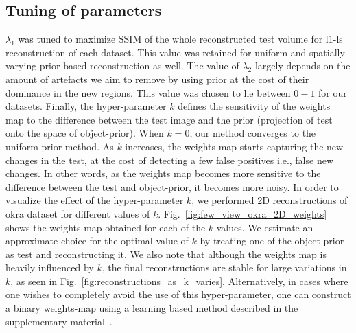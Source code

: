 \documentclass[journal]{IEEEtran}
\begin{document}

\subsection{Tuning of parameters}
\label{subsec:k}
 $\lambda_1$ was tuned to maximize
SSIM of the whole reconstructed test volume for l1-ls reconstruction
of each dataset. This value was retained for uniform and
spatially-varying prior-based reconstruction as well. The value of
$\lambda_2$ largely depends on the amount of artefacts we aim to
remove by using prior at the cost of their dominance in the new
regions. This value was chosen to lie between $0-1$ for our
datasets. Finally, the hyper-parameter $k$ defines the sensitivity of
the weights map to the difference between the test image and the prior
(projection of test onto the space of object-prior). When $k=0$, our
method converges to the uniform prior method. As $k$ increases, the
weights map starts capturing the new changes in the test, at the cost
of detecting a few false positives i.e., false new changes. In other
words, as the weights map becomes more sensitive to the difference
between the test and object-prior, it becomes more noisy. In order to
visualize the effect of the hyper-parameter $k$, we performed 2D
reconstructions of okra dataset for different values of
$k$. Fig.~\ref{fig:few_view_okra_2D_weights} shows the weights map
obtained for each of the $k$ values. We estimate an approximate choice
for the optimal value of $k$ by treating one of the object-prior as
test and reconstructing it. We also note that although the weights map
is heavily influenced by $k$, the final reconstructions are stable for
large variations in $k$, as seen in
Fig.~\ref{fig:reconstructions_as_k_varies}. Alternatively, in cases
where one wishes to completely avoid the use of this hyper-parameter,
one can construct a binary weights-map using a learning based method
described in the supplementary material~\cite{supp_paper}.

\end{document}
